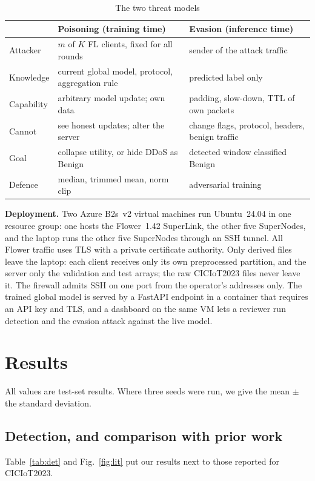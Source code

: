 \documentclass[conference]{IEEEtran}
\begin{document}
\begin{table}[t]
\caption{The two threat models}\label{tab:threat}
\centering\footnotesize
\setlength{\tabcolsep}{2.5pt}
\begin{tabular}{@{}p{}p{}p{}@{}}
\toprule
 & Poisoning (training time) & Evasion (inference time) \\
\midrule
Attacker & $m$ of $K$ FL clients, fixed for all rounds & sender of the attack traffic \\
Knowledge & current global model, protocol, aggregation rule & predicted label only \\
Capability & arbitrary model update; own data & padding, slow-down, TTL of own packets \\
Cannot & see honest updates; alter the server & change flags, protocol, headers, benign traffic \\
Goal & collapse utility, or hide DDoS as Benign & detected window classified Benign \\
Defence & median, trimmed mean, norm clip & adversarial training \\
\bottomrule
\end{tabular}
\end{table}

\textbf{Deployment.} Two Azure B2s~v2 virtual machines run Ubuntu~24.04 in one resource group: one hosts the Flower~1.42 SuperLink, the other five SuperNodes, and the laptop runs the other five SuperNodes through an SSH tunnel. All Flower traffic uses TLS with a private certificate authority. Only derived files leave the laptop: each client receives only its own preprocessed partition, and the server only the validation and test arrays; the raw CICIoT2023 files never leave it. The firewall admits SSH on one port from the operator's addresses only. The trained global model is served by a FastAPI endpoint in a container that requires an API key and TLS, and a dashboard on the same VM lets a reviewer run detection and the evasion attack against the live model.

\section{Results}
All values are test-set results. Where three seeds were run, we give the mean $\pm$ the standard deviation.

\subsection{Detection, and comparison with prior work}\label{sec:det}
Table~\ref{tab:det} and Fig.~\ref{fig:lit} put our results next to those reported for CICIoT2023.
\end{document}

